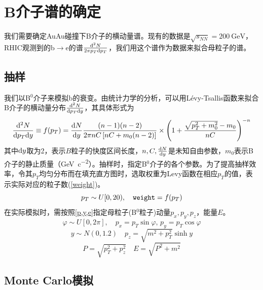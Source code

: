 \documentclass[12pt, a4paper]{ctexart}
\begin{document}

\section{B介子谱的确定} %
\label{sec:b粒子谱的确定}
我们需要确定AuAu碰撞下B介子的横动量谱。现有的数据是$\sqrt{s_{NN}}=\SI{200}{\GeV}$，RHIC观测到的b$\to$e的谱$\frac{\mathrm{d} ^2N}{2\pi p_T\mathrm{d} p_T}$\cite{SI2020135465}，我们用这个谱作为数据来拟合母粒子的谱。
\subsection{抽样} %
\label{sub:抽样}
我们以B$^0$介子来模拟b的衰变。由统计力学的分析\cite{tsallis1999nonextensive}，可以用L\'evy-Tsallis函数来拟合B介子的横动量分布$\frac{\mathrm{d} ^2N}{\mathrm{d} p_T\mathrm{d} y}$，其具体形式为
\begin{equation}\label{levy}
\frac{\mathrm{d} ^2N}{\mathrm{d} p_T\mathrm{d} y} \equiv f(p_T) = \frac{\mathrm{d} N}{\mathrm{d} y}\frac{(n-1)(n-2)}{2\pi n C\left[nC+m_0(n-2)\right]}\times\left(1+\frac{\sqrt{p_T^2+m_0^2}-m_0}{nC}\right)^{-n}	
\end{equation}
其中$\mathrm{d} y$取为2，表示$B$粒子的快度区间长度，$n,C,\frac{\mathrm{d} N}{\mathrm{d} y}$是未知自由参数，$m_0$表示B介子的静止质量（\si{\GeV\per c^2}）。抽样时，指定B$^0$介子的各个参数。为了提高抽样效率，令其$p_T$均匀分布而在填充直方图时，选取权重为Levy函数在相应$p_T$的值，表示实际对应的粒子数(\cref{weight})。
\begin{equation}\label{weight}
	p_T\sim U[0,20),\quad \text{\texttt{weight}}=f(p_T)
\end{equation}
在实际模拟时，需按照\cref{p,y,e}指定\cite{explaination}母粒子(B$^0$粒子)动量$p_x,p_y,p_z$，能量$E$。
\begin{equation}
\label{p}
	\varphi\sim U[0,2\pi],\quad p_x = p_T\sin\varphi,\,
			p_y = p_T\cos\varphi \end{equation}\begin{equation}
		\label{y}
	y\sim N(0, 1.2)\quad p_z = \sqrt{m^2+p_T^2}\sinh y\end{equation}\begin{equation}
	\label{e}
	P = \sqrt{p_T^2+p_z^2} \quad E = \sqrt{P^2+m^2} 
\end{equation}


\subsection{Monte Carlo模拟} %
\label{sub:monte_carlo模拟}
\end{document}
